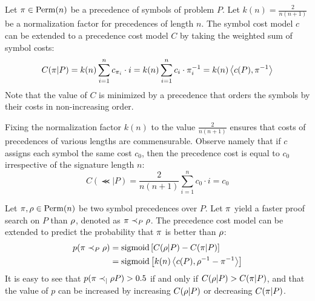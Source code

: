 Let $\pi \in \mathrm{Perm}(n)$ be a precedence of symbols of problem $P$.
Let $k(n) = \frac{2}{n(n+1)}$ be a normalization factor for precedences of length $n$.
The symbol cost model $c$ can be extended to a precedence cost model $C$
by taking the weighted sum of symbol costs:
\begin{equation} \label{eq:model_cost}
C(\pi | P)
= k(n) \sum_{i=1}^n c_{\pi_i} \cdot i
= k(n) \sum_{i=1}^n c_i \cdot \pi^{-1}_i
= k(n) \left<c(P),\pi^{-1}\right>
\end{equation}
Note that the value of $C$ is minimized by a precedence that orders the symbols by their costs in non-increasing order.

Fixing the normalization factor $k(n)$ to the value $\frac{2}{n(n+1)}$
ensures that costs of precedences of various lengths are commensurable.
Observe namely that if $c$ assigns each symbol the same cost $c_0$,
then the precedence cost is equal to $c_0$ irrespective of the signature length $n$:
$$
C(\Prec | P) = \frac{2}{n(n+1)} \sum_{i=1}^n c_0 \cdot i = c_0
$$

Let $\pi, \rho \in \mathrm{Perm}(n)$ be two symbol precedences over $P$.
Let $\pi$ yield a faster proof search on $P$ than $\rho$, denoted as $\pi \prec_{P} \rho$.
The precedence cost model can be extended to predict the probability that $\pi$ is better than $\rho$:
\begin{align*}
p(\pi \prec_{P} \rho)
&= \operatorname{sigmoid} \left[C(\rho | P) - C(\pi | P)\right] \\
&= \operatorname{sigmoid} \left[k(n) \left<c(P),\rho^{-1} - \pi^{-1}\right>\right]
\end{align*}
It is easy to see that $p(\pi \prec_{|} \rho P) > 0.5$ if and only if $C(\rho | P) > C(\pi | P)$,
and that the value of $p$ can be increased by increasing $C(\rho | P)$ or decreasing $C(\pi | P)$.

